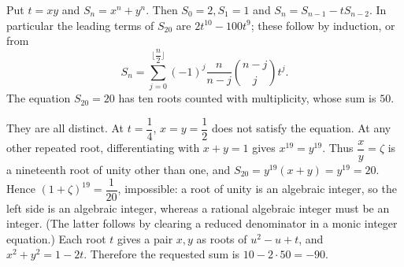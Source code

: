 Put $t=xy$ and $S_n=x^n+y^n$. Then $S_0=2,S_1=1$ and $S_n=S_{n-1}-tS_{n-2}$. In particular the leading terms of $S_{20}$ are $2t^{10}-100t^9$; these follow by induction, or from
\[
S_n=\sum_{j=0}^{\lfloor \dfrac{n}{2}\rfloor}(-1)^j\dfrac{n}{n-j}\binom{n-j}{j}t^j.
\]
The equation $S_{20}=20$ has ten roots counted with multiplicity, whose sum is $50$.

They are all distinct. At $t=\dfrac{1}{4}$, $x=y=\dfrac{1}{2}$ does not satisfy the equation. At any other repeated root, differentiating with $x+y=1$ gives $x^{19}=y^{19}$. Thus $\dfrac{x}{y}=\zeta$ is a nineteenth root of unity other than one, and $S_{20}=y^{19}(x+y)=y^{19}=20$. Hence $(1+\zeta)^{19}=\dfrac{1}{20}$, impossible: a root of unity is an algebraic integer, so the left side is an algebraic integer, whereas a rational algebraic integer must be an integer. (The latter follows by clearing a reduced denominator in a monic integer equation.)
Each root $t$ gives a pair $x,y$ as roots of $u^2-u+t$, and $x^2+y^2=1-2t$. Therefore the requested sum is $\boxed{10-2\cdot50=-90}$.
